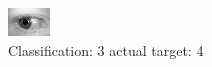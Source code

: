 \begin{figure}[h!]
\begin{center}
\includegraphics[width=0.60\columnwidth]{figures/ID743_class_3_target_4.png}
\end{center}
\caption{ Classification: 3 actual target: 4}
\label{fig:ID743_class_3_target_4}
\end{figure}
